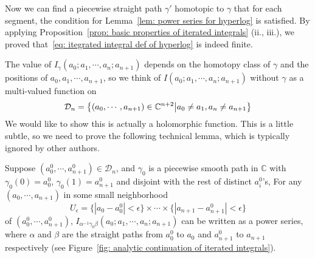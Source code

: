 \vspace{1cm}

Now we can find a piecewise straight path $\gamma'$ homotopic to $\gamma$ that for each segment, the condition for Lemma~\ref{lem: power series for hyperlog} is satisfied. By applying Proposition~\ref{prop: basic properties of iterated integrals} (ii., iii.), we proved that~\eqref{eq: itegrated integral def of hyperlog} is indeed finite.


The value of $I_\gamma(a_0;a_1,\cdots,a_n;a_{n+1})$ depends on the homotopy class of $\gamma$ and the positions of $a_0,a_1,\cdots,a_{n+1}$, so we think of $I(a_0;a_1,\cdots,a_n;a_{n+1})$ without $\gamma$ as a multi-valued function on
\begin{equation}\label{eq: domain of I(a0;...;a_{n+1})}
\mathcal D_n=\left\{(a_0,\cdots,a_{n+1})\in\mathbb C^{n+2}\middle|a_0\neq a_1,a_n\neq a_{n+1}\right\}
\end{equation}
We would like to show this is actually a holomorphic function. This is a little subtle, so we need to prove the following technical lemma, which is typically ignored by other authors.

\begin{lemma}\label{lem: analytic continuation of I(a0,...,a_{n+1})}
Suppose $(a^0_0,\cdots,a^0_{n+1})\in\mathcal D_n$, and $\gamma_0$ is a piecewise smooth path in $\mathbb C$ with $\gamma_0(0)=a_0^0$, $\gamma_0(1)=a_{n+1}^0$ and disjoint with the rest of distinct $a_i^0$'s, For any $(a_0,\cdots,a_{n+1})$ in some small neighborhood
\[
U_\epsilon=\{|a_0-a^0_0|<\epsilon\}\times\cdots\times\{|a_{n+1}-a^0_{n+1}|<\epsilon\}
\]
of $(a_0^0,\cdots,a_{n+1}^0)$, $I_{\alpha^{-1}\gamma_0\beta}(a_0;a_1,\cdots,a_n;a_{n+1})$ can be written as a power series, where $\alpha$ and $\beta$ are the straight paths from $a_0^0$ to $a_0$ and $a_{n+1}^0$ to $a_{n+1}$ respectively (see Figure~\ref{fig: analytic continuation of iterated integrals}).
\end{lemma}

